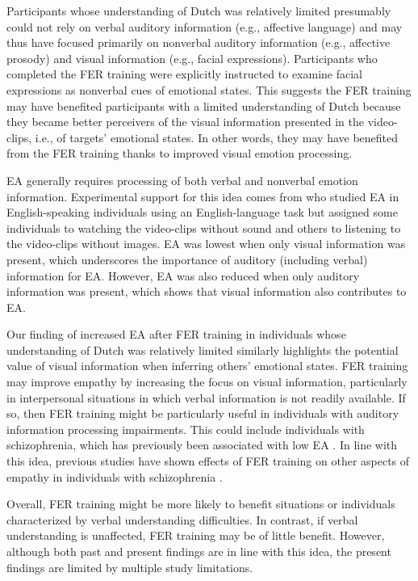 \documentclass[authordate, empirical, issue]{jote-new-article}
\begin{document}
Participants whose understanding of Dutch was relatively limited presumably could not rely on verbal auditory information (e.g., affective language) and may thus have focused primarily on nonverbal auditory information (e.g., affective prosody) and visual information (e.g., facial expressions). Participants who completed the FER training were explicitly instructed to examine facial expressions as nonverbal cues of emotional states. This suggests the FER training may have benefited participants with a limited understanding of Dutch because they became better perceivers of the visual information presented in the video-clips, i.e., of targets' emotional states. In other words, they may have benefited from the FER training thanks to improved visual emotion processing.



EA generally requires processing of both verbal and nonverbal emotion information. Experimental support for this idea comes from \textcite{Zaki2009} who studied EA in English-speaking individuals using an English-language task but assigned some individuals to watching the video-clips without sound and others to listening to the video-clips without images. EA was lowest when only visual information was present, which underscores the importance of auditory (including verbal) information for EA. However, EA was also reduced when only auditory information was present, which shows that visual information also contributes to EA.



Our finding of increased EA after FER training in individuals whose understanding of Dutch was relatively limited similarly highlights the potential value of visual information when inferring others' emotional states. FER training may improve empathy by increasing the focus on visual information, particularly in interpersonal situations in which verbal information is not readily available. If so, then FER training might be particularly useful in individuals with auditory information processing impairments. This could include individuals with schizophrenia, which has previously been associated with low EA \parencites{Lee2011}. In line with this idea, previous studies have shown effects of FER training on other aspects of empathy in individuals with schizophrenia \parencites{Mazza2010}{Russell2006}{Russell2008}.



Overall, FER training might be more likely to benefit situations or individuals characterized by verbal understanding difficulties. In contrast, if verbal understanding is unaffected, FER training may be of little benefit. However, although both past and present findings are in line with this idea, the present findings are limited by multiple study limitations.
\end{document}
